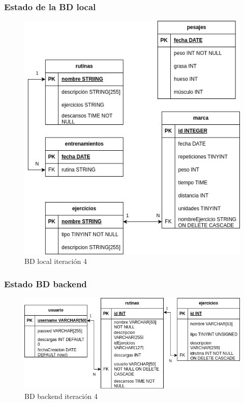 \subsubsection{Estado de la BD local}

\begin{figure}[H]
    \centering
    \includegraphics[width=\textwidth]{fotos/BDL iteracion 4.png}
    \caption{BD local iteración 4}
    \label{fig:BDL iteracion 4}
\end{figure}

\subsubsection{Estado BD backend}

\begin{figure}[H]
    \centering
    \includegraphics[width=\textwidth]{fotos/BD be iteracion 4.png}
    \caption{BD backend iteración 4}
    \label{fig:BD be iteracion 4}
\end{figure}

